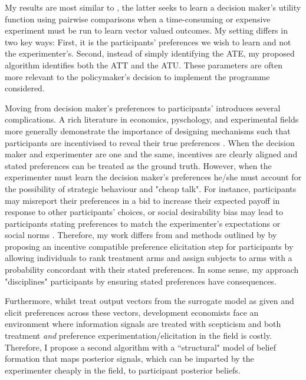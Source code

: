 \documentclass[twoside,11pt]{article}
\begin{document}
My results are most similar to \citep{dewancker2016a,lin2022preference}, the latter seeks 
to learn a decision maker's utility function using pairwise comparisons when a 
time-consuming or expensive experiment must be run to learn 
vector valued outcomes. My setting differs in two key ways: First, it is the 
participants' preferences we wish to learn and not the experimenter's. Second, 
instead of simply identifying the ATE, my proposed algorithm identifies both 
the ATT and the ATU. These parameters are often more relevant to the policymaker's 
decision to implement the programme considered.


Moving from decision maker's preferences to participants' introduces several 
complications. A rich literature in economics, pyschology, and experimental fields 
more generally demonstrate 
the importance of designing mechanisms such that participants are incentivised 
to reveal their true preferences \citep{Savage1971,ar-delavande}. When the decision maker and experimenter are 
one and the same, 
incentives are clearly aligned and stated preferences can be treated as the ground 
truth. However, when the experimenter must learn the decision maker's 
preferences he/she must account for the possibility of strategic behaviour and 
"cheap talk". For instance, participants may misreport their preferences in a bid
to increase their expected payoff in response to other participants' choices, or 
social desirability bias may lead to participants stating preferences to match 
the experimenter's expectations or social norms \citep{brownback2018a}. Therefore, my work 
differs from \cite{lin2022preference} and methods outlined by \citep{furnkranz2010a} by proposing 
an incentive compatible 
preference elicitation step for participants by allowing individuals
to rank treatment arms and assign subjects to arms with a probability
concordant with their stated preferences. In some sense, my approach "disciplines"
participants by ensuring stated preferences have consequences.


Furthermore, whilst \cite{lin2022preference} treat output vectors from the surrogate 
model as given and elicit preferences across these vectors, development economists 
face an environment where information signals are treated with 
scepticism and both treatment \textit{and} preference experimentation/elicitation
 in the field is costly. Therefore, I propose a second algorithm with a ``structural" 
 model of belief formation that maps posterior signals, which can be imparted by 
 the experimenter cheaply in the field, to participant posterior beliefs.
\end{document}

